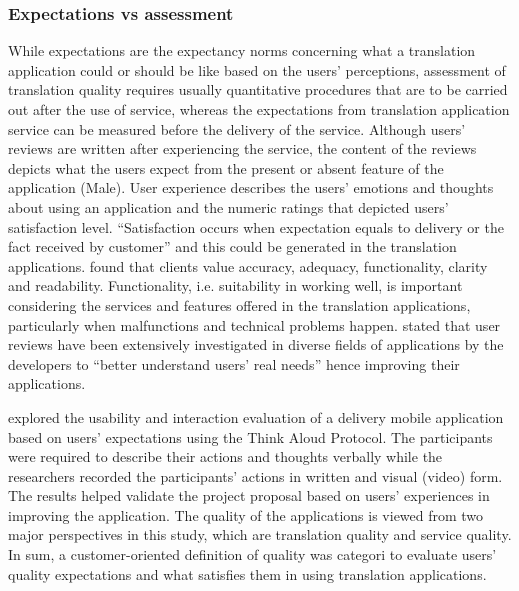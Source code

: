 \documentclass[english]{textolivre}
\begin{document}
\subsubsection{Expectations vs assessment}\label{sec-organizacao}
While expectations are the expectancy norms concerning what a translation application could or should be like based on the users’ perceptions, assessment of translation quality requires usually quantitative procedures that are to be carried out after the use of service, whereas the expectations from translation application service can be measured before the delivery of the service. Although users’ reviews are written after experiencing the service, the content of the reviews depicts what the users expect from the present or absent feature of the application (Male). User experience describes the users’ emotions and thoughts about using an application and the numeric ratings that depicted users’ satisfaction level. “Satisfaction occurs when expectation equals to delivery or the fact received by customer” \cite[p. 28]{khristianto_influence_2012} and this could be generated in the translation applications. \textcite{havumetsa_client_2012} found that clients value accuracy, adequacy, functionality, clarity and readability. Functionality, i.e. suitability in working well, is important considering the services and features offered in the translation applications, particularly when malfunctions and technical problems happen. \textcite[p. 1]{yang_study_2018} stated that user reviews have been extensively investigated in diverse fields of applications by the developers to “better understand users’ real needs” hence improving their applications.

\textcite{guimaraes_usability_2019} explored the usability and interaction evaluation of a delivery mobile application based on users’ expectations using the Think Aloud Protocol. The participants were required to describe their actions and thoughts verbally while the researchers recorded the participants’ actions in written and visual (video) form. The results helped validate the project proposal based on users’ experiences in improving the application. The quality of the applications is viewed from two major perspectives in this study, which are translation quality and service quality. In sum, a customer-oriented definition of quality was categori to evaluate users’ quality expectations and what satisfies them in using translation applications.
\end{document}
